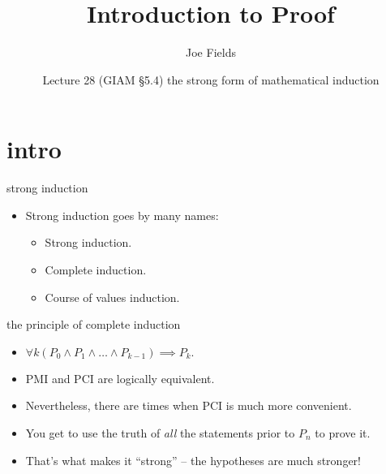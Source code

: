 \documentclass[handout,landscape]{beamer}
\author{Joe Fields}
\title{Introduction to Proof}
\date{Lecture 28 (GIAM \S 5.4) \newline the strong form of mathematical induction}
\institute[SCSU]{ {\tt fieldsj1@southernct.edu} }
\begin{document}
\begin{frame}[plain]
  \titlepage
\end{frame}

\section{intro}

\begin{frame}{strong induction}
\begin{itemize}
\item Strong induction goes by many names: \pause
\begin{itemize}
\item Strong induction. \pause
\item Complete induction. \pause
\item Course of values induction. \pause
\end{itemize}
\end{itemize}
\end{frame}


\begin{frame}{the principle of complete induction}
\begin{itemize}
\item $ \displaystyle \forall k (P_0 \land P_1 \land \ldots \land  P_{k-1}) \implies P_k. $
\item PMI and PCI are logically equivalent. \pause
\item Nevertheless, there are times when PCI is much more convenient. \pause
\item You get to use the truth of {\em all} the statements prior to $P_n$ to prove it. \pause
\item That's what makes it ``strong'' -- the hypotheses are much stronger!
\end{itemize}
\end{frame}
\end{document}

